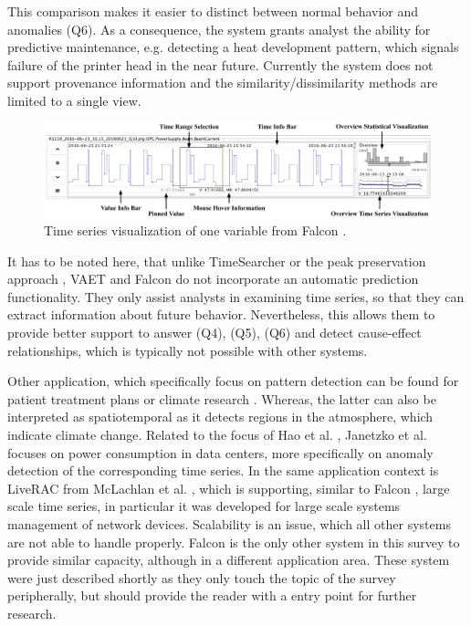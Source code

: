 \documentclass[electronic]{vgtc}             %
\begin{document}
This comparison makes it easier to distinct between normal behavior and anomalies (Q6). 
As a consequence, the system grants analyst the ability for predictive maintenance, e.g. detecting a heat development pattern, which signals failure of the printer head in the near future. 
Currently the system does not support provenance information and the similarity/dissimilarity methods are limited to a single view.

\begin{figure}[htb]
	\centering
	\includegraphics[width=\columnwidth]{Falcon}
	\caption{Time series visualization of one variable from Falcon \cite{steed:2017}.
	}
	\label{fig:falcon}
\end{figure}

It has to be noted here, that unlike TimeSearcher \cite{Hochheiser:2004, buono:2005, buono:2007} or the peak preservation approach \cite{Hao:2012}, VAET \cite{Xie:2014} and Falcon \cite{steed:2017} do not incorporate an automatic prediction functionality.
They only assist analysts in examining time series, so that they can extract information about future behavior. 
Nevertheless, this allows them to provide better support to answer (Q4), (Q5), (Q6) and detect cause-effect relationships, which is typically not possible with other systems. 

Other application, which specifically focus on pattern detection can be found for patient treatment plans \cite{Gschwandtner:2011} or climate research \cite{Kehrer:2008}.
Whereas, the latter can also be interpreted as spatiotemporal as it detects regions in the atmosphere, which indicate climate change.
Related to the focus of Hao et al. \cite{Hao:2009, Hao:2011}, Janetzko et al. \cite{janetzko:2014} focuses on power consumption in data centers, more specifically on anomaly detection of the corresponding time series.
In the same application context is LiveRAC from McLachlan et al. \cite{McLachlan:2008}, which is supporting, similar to Falcon \cite{steed:2017},  large scale time series, in particular it was developed for large scale systems management of network devices.
Scalability is an issue, which all other systems are not able to handle properly.
Falcon \cite{steed:2017} is the only other system in this survey to provide similar capacity, although in a different application area. 
These system were just described shortly as they only touch the topic of the survey peripherally, but should provide the reader with a entry point for further research.
\end{document}
